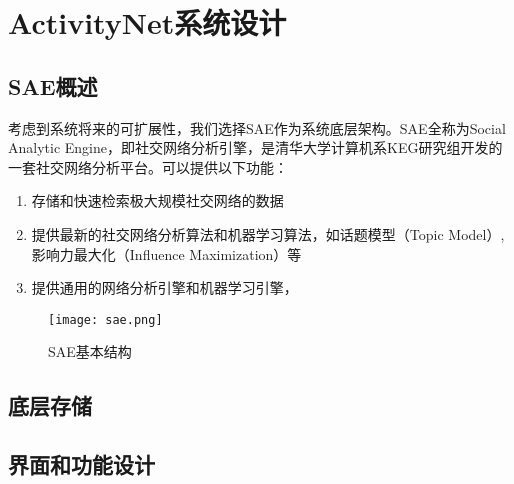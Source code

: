 \chapter{ActivityNet系统设计}

\section{SAE概述}
考虑到系统将来的可扩展性，我们选择SAE作为系统底层架构。SAE全称为Social Analytic Engine，即社交网络分析引擎，是清华大学计算机系KEG研究组开发的一套社交网络分析平台。可以提供以下功能：
\begin{enumerate}
\item 存储和快速检索极大规模社交网络的数据
\item 提供最新的社交网络分析算法和机器学习算法，如话题模型（Topic Model）, 影响力最大化（Influence Maximization）等
\item 提供通用的网络分析引擎和机器学习引擎，
\end{enumerate}

\begin{figure}[!h]
\centering
\texttt{[image: sae.png]}
\caption{SAE基本结构}
\label{fig:sae_arch}
\end{figure}

\section{底层存储}

\section{界面和功能设计}
